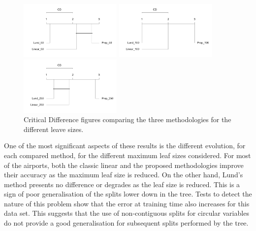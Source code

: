 \documentclass[times,twocolumn,final,authoryear]{elsarticle}
\begin{document}
\begin{figure}
\centering
\parbox{5cm}{
\includegraphics[width=5cm]{CD_50.png}}
\qquad
\begin{minipage}{5cm}
\includegraphics[width=5cm]{CD_100.png}
\qquad
\end{minipage}
\qquad
\begin{minipage}{5cm}
\includegraphics[width=5cm]{CD_250.png}
\qquad
\end{minipage}
\caption{Critical Difference figures comparing the three methodologies for the different leave sizes.}
\label{f7}
\end{figure}

One of the most significant aspects of these results is the different evolution, for each compared method, for the different maximum leaf sizes considered. For most of the airports, both the classic linear and the proposed methodologies improve their accuracy as the maximum leaf size is reduced. On the other hand, Lund's method presents no difference or degrades as the leaf size is reduced. This is a sign of poor generalisation of the splits lower down in the tree. Tests to detect the nature of this problem show that the error at training time also increases for this data set. This suggests that the use of non-contiguous splits for circular variables do not provide a good generalisation for subsequent splits performed by the tree.
\end{document}
